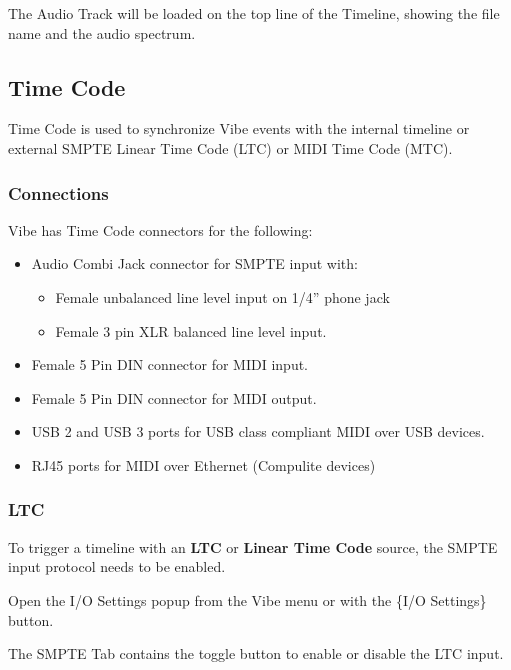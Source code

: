 \documentclass[
]{article}
\begin{document}
The Audio Track will be loaded on the top line of the Timeline, showing the file name and the audio spectrum.

\hypertarget{Time-Code-14.2}{%
\subsection{Time Code}\label{Time-Code-14.2}}

Time Code is used to synchronize Vibe events with the internal timeline or external SMPTE Linear Time Code (LTC) or MIDI Time Code (MTC).

\hypertarget{connections}{%
\subsubsection{Connections}\label{connections}}

Vibe has Time Code connectors for the following:

\begin{itemize}
\item
  Audio Combi Jack connector for SMPTE input with:

  \begin{itemize}
  \item
    Female unbalanced line level input on 1/4'' phone jack
  \item
    Female 3 pin XLR balanced line level input.
  \end{itemize}
\item
  Female 5 Pin DIN connector for MIDI input.
\item
  Female 5 Pin DIN connector for MIDI output.
\item
  USB 2 and USB 3 ports for USB class compliant MIDI over USB devices.
\item
  RJ45 ports for MIDI over Ethernet (Compulite devices)
\end{itemize}

\hypertarget{ltc}{%
\subsubsection{LTC}\label{ltc}}

To trigger a timeline with an \textbf{LTC} or \textbf{Linear Time Code} source, the SMPTE input protocol needs to be enabled.

Open the I/O Settings popup from the Vibe menu or with the \{I/O Settings\} button.

The SMPTE Tab contains the toggle button to enable or disable the LTC input.
\end{document}
